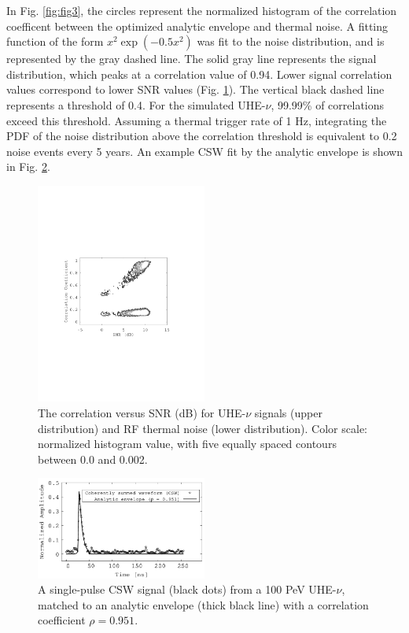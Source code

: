 \documentclass[amsmath,amssymb,aps,prd,10pt,twocolumn,showkeys]{revtex4}
\begin{document}
In Fig. \ref{fig:fig3}, the circles represent the normalized histogram of the correlation coefficent between the optimized analytic envelope and thermal noise.  A fitting function of the form $x^2 \exp(-0.5 x^2)$ was fit to the noise distribution, and is represented by the gray dashed line.  The solid gray line represents the signal distribution, which peaks at a correlation value of 0.94.  Lower signal correlation values correspond to lower SNR values (Fig. \ref{fig:fig4}).  The vertical black dashed line represents a threshold of 0.4.  For the simulated UHE-$\nu$, 99.99\% of correlations exceed this threshold.  Assuming a thermal trigger rate of 1 Hz, integrating the PDF of the noise distribution above the correlation threshold is equivalent to 0.2 noise events every 5 years.  An example CSW fit by the analytic envelope is shown in Fig. \ref{fig:example_waveforms}.

\begin{figure}
\centering
\includegraphics[width=0.5\textwidth,trim=3.25cm 8.25cm 4.5cm 9.0cm,clip=true]{Aug15_plot2.pdf}
\caption{\label{fig:fig4} The correlation versus SNR (dB) for UHE-$\nu$ signals (upper distribution) and RF thermal noise (lower distribution).  Color scale: normalized histogram value, with five equally spaced contours between 0.0 and 0.002.}
\end{figure}

\begin{figure}
\centering
\includegraphics[width=0.5\textwidth]{Sept25_plot1.pdf}
\caption{\label{fig:example_waveforms} A single-pulse CSW signal (black dots) from a 100 PeV UHE-$\nu$, matched to an analytic envelope (thick black line) with a correlation coefficient $\rho = 0.951$.}
\end{figure}
\end{document}
